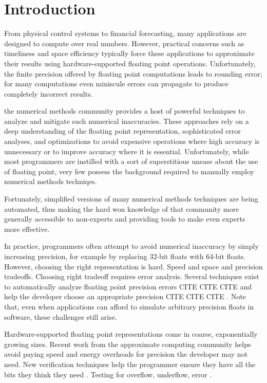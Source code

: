 \documentclass[paper.tex]{subfiles}
\begin{document}
\section{Introduction}
\label{sec:intro}

From physical control systems to financial forecasting, many
applications are designed to compute over real numbers.  However,
practical concerns such as timeliness and space efficiency typically
force these applications to approximate their results using
hardware-supported floating point operations.  Unfortunately, the
finite precision offered by floating point computations leads to
rounding error; for many computations even miniscule errors can
propagate to produce completely incorrect results.

 the numerical methods community provides a host
of powerful techniques to analyze and mitigate such numerical
inaccuracies.  These approaches rely on a deep understanding of the
floating point representation, sophisticated error analyses, and
optimizations to avoid expensive operations where high accuracy is
unnecessary or to improve accuracy where it is
essential. Unfortunately, while most programmers are instilled with a
sort of superstitious unease about the use of floating point, very few
possess the background required to manually employ numerical methods
techniqes.

Fortunately, simplified versions of many numerical methods techniques
are being automated, thus making the hard won knowledge of that
community more generally accessible to non-experts and providing tools
to make even experts more effective.

In practice, programmers often attempt to avoid numerical inaccuracy
by simply increasing precision, for example by replacing 32-bit floats
with 64-bit floats.  However, choosing the right representation is
hard.  Speed and space and precision tradeoffs.  Choosing right
tradeoff requires error analysis.  Several techniques exist to
automatically analyze floating point precision errors CITE CITE CITE
and help the developer choose an appropriate precision CITE CITE CITE
.  Note that, even when applications can afford to simulate
arbitrary precision floats in software, these challenges still arise.


Hardware-supported floating point representations come in coarse,
exponentially growing sizes.  Recent work from the approximate
computing community helps avoid paying speed and energy overheads for
precision the developer may not need.   New
verification techniques help the programmer ensure they have all the
bits they think they need .  Testing for overflow,
underflow, error .
\end{document}
